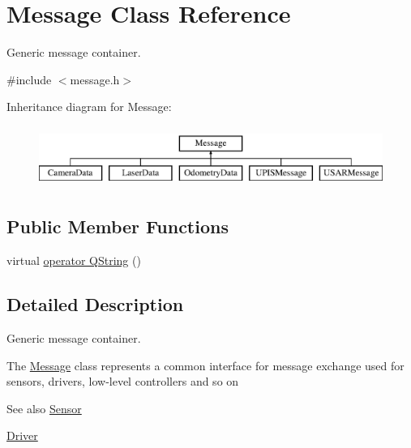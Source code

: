 \hypertarget{classMessage}{
\section{Message Class Reference}
\label{classMessage}
}


Generic message container.  




{\ttfamily \#include $<$message.h$>$}

Inheritance diagram for Message:\begin{figure}[H]
\begin{center}
\leavevmode
\includegraphics[height=2.000000cm]{classMessage}
\end{center}
\end{figure}
\subsection*{Public Member Functions}
\begin{DoxyCompactItemize}
\item 
virtual \hyperlink{classMessage_a58bb4122c52eaf1ac8f68d3ea0f151b8}{operator QString} ()
\end{DoxyCompactItemize}


\subsection{Detailed Description}
Generic message container. 

The \hyperlink{classMessage}{Message} class represents a common interface for message exchange used for sensors, drivers, low-\/level controllers and so on

\begin{DoxySeeAlso}{See also}
\hyperlink{classSensor}{Sensor} 

\hyperlink{classDriver}{Driver} 
\end{DoxySeeAlso}


